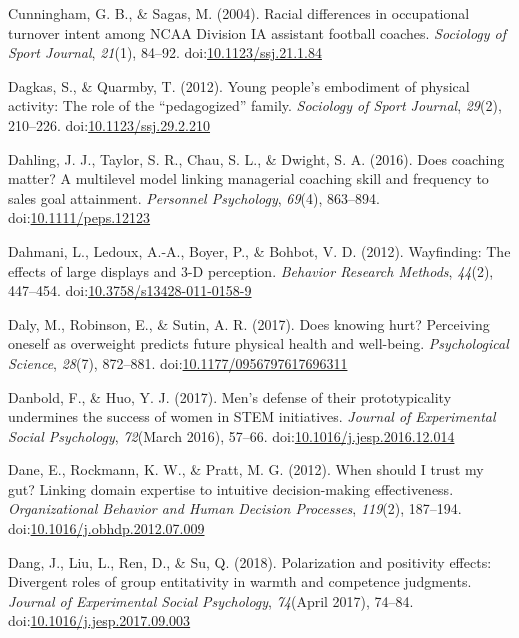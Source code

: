\documentclass[english,man]{apa6}
\begin{document}
\hypertarget{ref-Cunningham2004}{}
Cunningham, G. B., \& Sagas, M. (2004). Racial differences in
occupational turnover intent among NCAA Division IA assistant football
coaches. \emph{Sociology of Sport Journal}, \emph{21}(1), 84--92.
doi:\href{https://doi.org/10.1123/ssj.21.1.84}{10.1123/ssj.21.1.84}

\hypertarget{ref-Dagkas2012}{}
Dagkas, S., \& Quarmby, T. (2012). Young people's embodiment of physical
activity: The role of the ``pedagogized'' family. \emph{Sociology of
Sport Journal}, \emph{29}(2), 210--226.
doi:\href{https://doi.org/10.1123/ssj.29.2.210}{10.1123/ssj.29.2.210}

\hypertarget{ref-Dahling2016}{}
Dahling, J. J., Taylor, S. R., Chau, S. L., \& Dwight, S. A. (2016).
Does coaching matter? A multilevel model linking managerial coaching
skill and frequency to sales goal attainment. \emph{Personnel
Psychology}, \emph{69}(4), 863--894.
doi:\href{https://doi.org/10.1111/peps.12123}{10.1111/peps.12123}

\hypertarget{ref-Dahmani2012}{}
Dahmani, L., Ledoux, A.-A., Boyer, P., \& Bohbot, V. D. (2012).
Wayfinding: The effects of large displays and 3-D perception.
\emph{Behavior Research Methods}, \emph{44}(2), 447--454.
doi:\href{https://doi.org/10.3758/s13428-011-0158-9}{10.3758/s13428-011-0158-9}

\hypertarget{ref-Daly2017}{}
Daly, M., Robinson, E., \& Sutin, A. R. (2017). Does knowing hurt?
Perceiving oneself as overweight predicts future physical health and
well-being. \emph{Psychological Science}, \emph{28}(7), 872--881.
doi:\href{https://doi.org/10.1177/0956797617696311}{10.1177/0956797617696311}

\hypertarget{ref-Danbold2017}{}
Danbold, F., \& Huo, Y. J. (2017). Men's defense of their
prototypicality undermines the success of women in STEM initiatives.
\emph{Journal of Experimental Social Psychology}, \emph{72}(March 2016),
57--66.
doi:\href{https://doi.org/10.1016/j.jesp.2016.12.014}{10.1016/j.jesp.2016.12.014}

\hypertarget{ref-Dane2012}{}
Dane, E., Rockmann, K. W., \& Pratt, M. G. (2012). When should I trust
my gut? Linking domain expertise to intuitive decision-making
effectiveness. \emph{Organizational Behavior and Human Decision
Processes}, \emph{119}(2), 187--194.
doi:\href{https://doi.org/10.1016/j.obhdp.2012.07.009}{10.1016/j.obhdp.2012.07.009}

\hypertarget{ref-Dang2018}{}
Dang, J., Liu, L., Ren, D., \& Su, Q. (2018). Polarization and
positivity effects: Divergent roles of group entitativity in warmth and
competence judgments. \emph{Journal of Experimental Social Psychology},
\emph{74}(April 2017), 74--84.
doi:\href{https://doi.org/10.1016/j.jesp.2017.09.003}{10.1016/j.jesp.2017.09.003}
\end{document}
